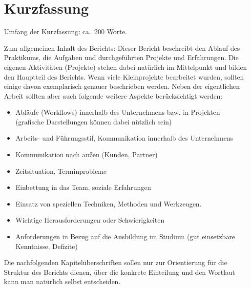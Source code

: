 \documentclass[praktikum,german]{hgbthesis}
\begin{document}

\author{Peter A.\ Schlaumeier}

\frontmatter
\maketitle
\tableofcontents

\chapter{Kurzfassung}
Umfang der Kurzfassung: ca.\ 200 Worte.

Zum allgemeinen Inhalt des Berichts: Dieser Bericht beschreibt den Ablauf des Praktikums, die Aufgaben und durchgeführten Projekte und Erfahrungen. Die eigenen Aktivitäten (Projekte) stehen dabei natürlich im Mittelpunkt und bilden den Hauptteil des Berichts. Wenn viele Kleinprojekte bearbeitet wurden, sollten einige davon exemplarisch
genauer beschrieben werden. Neben der eigentlichen Arbeit sollten aber auch folgende weitere Aspekte berücksichtigt werden:
%
\begin{itemize}
\item Abläufe (Workflows) innerhalb des Unternehmens bzw. in Projekten (grafische Darstellungen
können dabei nützlich sein)
\item Arbeits- und Führungsstil, Kommunikation innerhalb des Unternehmens
\item Kommunikation nach außen (Kunden, Partner)
\item Zeitsituation, Terminprobleme
\item Einbettung in das Team, soziale Erfahrungen
\item Einsatz von speziellen Techniken, Methoden und Werkzeugen.
\item Wichtige Herausforderungen oder Schwierigkeiten
\item Anforderungen in Bezug auf die Ausbildung im Studium (gut einsetzbare Kenntnisse, Defizite)
\end{itemize}
%
Die nachfolgenden Kapitelüberschriften sollen nur zur Orientierung für die Struktur des Berichts dienen, über die konkrete Einteilung und den Wortlaut kann man natürlich selbst entscheiden.
\end{document}
